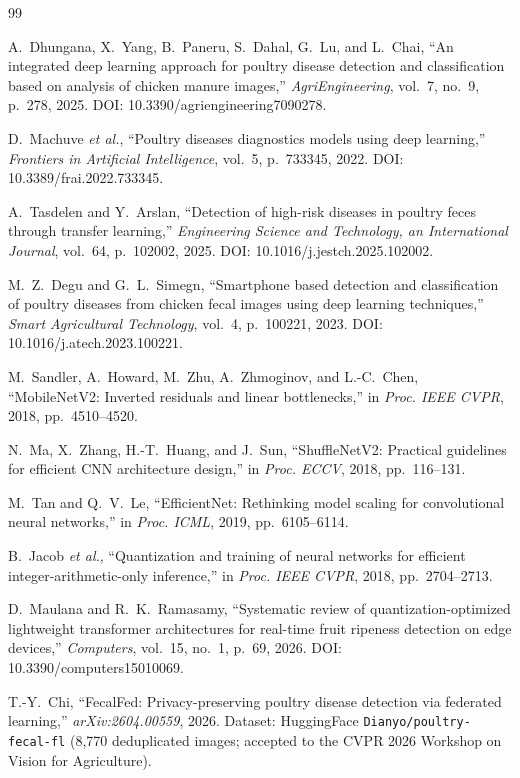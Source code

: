 \documentclass[conference,a4paper]{IEEEtran}
\begin{document}
\begin{thebibliography}{99}

A.~Dhungana, X.~Yang, B.~Paneru, S.~Dahal, G.~Lu, and L.~Chai, ``An integrated deep learning approach for poultry disease detection and classification based on analysis of chicken manure images,'' \emph{AgriEngineering}, vol.~7, no.~9, p.~278, 2025. DOI: 10.3390/agriengineering7090278.

D.~Machuve \textit{et al.}, ``Poultry diseases diagnostics models using deep learning,'' \emph{Frontiers in Artificial Intelligence}, vol.~5, p.~733345, 2022. DOI: 10.3389/frai.2022.733345.

A.~Tasdelen and Y.~Arslan, ``Detection of high-risk diseases in poultry feces through transfer learning,'' \emph{Engineering Science and Technology, an International Journal}, vol.~64, p.~102002, 2025. DOI: 10.1016/j.jestch.2025.102002.

M.~Z.~Degu and G.~L.~Simegn, ``Smartphone based detection and classification of poultry diseases from chicken fecal images using deep learning techniques,'' \emph{Smart Agricultural Technology}, vol.~4, p.~100221, 2023. DOI: 10.1016/j.atech.2023.100221.

M.~Sandler, A.~Howard, M.~Zhu, A.~Zhmoginov, and L.-C.~Chen, ``MobileNetV2: Inverted residuals and linear bottlenecks,'' in \emph{Proc. IEEE CVPR}, 2018, pp.~4510--4520.

N.~Ma, X.~Zhang, H.-T.~Huang, and J.~Sun, ``ShuffleNetV2: Practical guidelines for efficient CNN architecture design,'' in \emph{Proc. ECCV}, 2018, pp.~116--131.

M.~Tan and Q.~V.~Le, ``EfficientNet: Rethinking model scaling for convolutional neural networks,'' in \emph{Proc. ICML}, 2019, pp.~6105--6114.

B.~Jacob \textit{et al.}, ``Quantization and training of neural networks for efficient integer-arithmetic-only inference,'' in \emph{Proc. IEEE CVPR}, 2018, pp.~2704--2713.

D.~Maulana and R.~K.~Ramasamy, ``Systematic review of quantization-optimized lightweight transformer architectures for real-time fruit ripeness detection on edge devices,'' \emph{Computers}, vol.~15, no.~1, p.~69, 2026. DOI: 10.3390/computers15010069.

T.-Y.~Chi, ``FecalFed: Privacy-preserving poultry disease detection via federated learning,'' \textit{arXiv:2604.00559}, 2026. Dataset: HuggingFace \texttt{Dianyo/poultry-fecal-fl} (8,770 deduplicated images; accepted to the CVPR 2026 Workshop on Vision for Agriculture).


\end{thebibliography}
\end{document}
